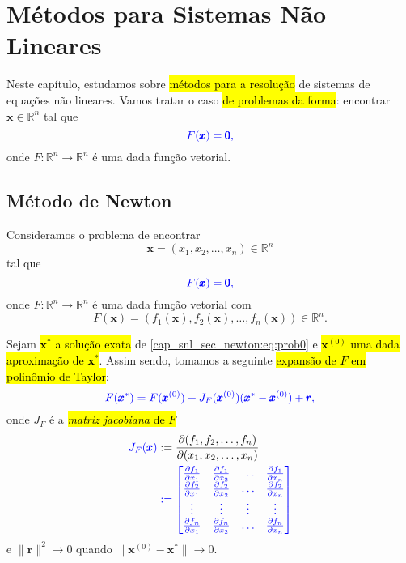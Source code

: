 
\chapter{Métodos para Sistemas Não Lineares}\label{cap_snl}

Neste capítulo, estudamos sobre \hl{métodos para a resolução} de sistemas de equações não lineares. Vamos tratar o caso \hl{de problemas da forma}: encontrar $\pmb{x}\in\mathbb{R}^n$ tal que
\begin{equation}\color{blue}F(\pmb{x}) = \pmb{0},
\end{equation}
onde $F:\mathbb{R}^n\to\mathbb{R}^n$ é uma dada função vetorial.

\section{Método de Newton}\label{cap_snl_sec_newton}

Consideramos o problema de encontrar
\begin{equation}
  \pmb{x} = (x_1, x_2, \dotsc, x_n)\in\mathbb{R}^n
\end{equation}
tal que
\begin{equation}\label{cap_snl_sec_newton:eq:prob0}\color{blue}F(\pmb{x}) = \pmb{0},
\end{equation}
onde $F:\mathbb{R}^n\to\mathbb{R}^n$ é uma dada função vetorial com
\begin{equation}
  F(\pmb{x}) = (f_1(\pmb{x}), f_2(\pmb{x}), \dotsc, f_n(\pmb{x}))\in\mathbb{R}^n.
\end{equation}

Sejam \hl{$\pmb{x}^*$ a solução exata} de \eqref{cap_snl_sec_newton:eq:prob0} e \hl{$\pmb{x}^{(0)}$ uma dada aproximação de $\pmb{x}^*$}. Assim sendo, tomamos a seguinte \hl{expansão de $F$ em polinômio de Taylor}{\taylor}:
\begin{equation}\color{blue}F(\pmb{x}^*) = F(\pmb{x}^{(0)}) + J_F(\pmb{x}^{(0)})(\pmb{x}^*-\pmb{x}^{(0)}) + \pmb{r},
\end{equation}
onde $J_F$ é a \hl{\emph{matriz jacobiana}{\jacobi} de $F$}
\begin{align}
  \color{blue}J_F(\pmb{x}) &:= \frac{\partial(f_1, f_2, \dotsc, f_n)}{\partial(x_1, x_2, \dotsc, x_n)}\\
  &\color{blue}:= \begin{bmatrix}
    \frac{\partial f_1}{\partial x_1} & \frac{\partial f_1}{\partial x_2} & \ldots & \frac{\partial f_1}{\partial x_n}\\
    \frac{\partial f_2}{\partial x_1} & \frac{\partial f_2}{\partial x_2} & \ldots & \frac{\partial f_2}{\partial x_n}\\
    \vdots & \vdots & \vdots & \vdots \\
    \frac{\partial f_n}{\partial x_1} & \frac{\partial f_n}{\partial x_2} & \ldots & \frac{\partial f_n}{\partial x_n}\\
  \end{bmatrix}
\end{align}
e $\|\pmb{r}\|^2\to 0$ quando $\|\pmb{x}^{(0)}-\pmb{x}^*\|\to 0$. 

